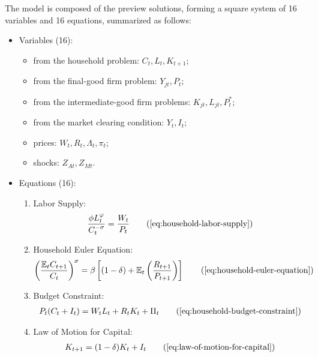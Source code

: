 \documentclass[
thesis.tex
]{subfiles}
\begin{document}
	The model is composed of the preview solutions, forming a square system of 16 variables and 16 equations, summarized as follows:
	
	{\singlespacing
		
		\begin{itemize}
			\item Variables (16):
			
			\begin{itemize}
				\item from the household problem: $C_t, L_t, K_{t+1}$;
				\item from the final-good firm problem: $Y_{jt}, P_t$;
				\item from the intermediate-good firm problems: $K_{jt}, L_{jt}, P_t^\ast$;
				\item from the market clearing condition: $Y_t, I_t$;
				\item prices: $W_t, R_t, \Lambda_t, \pi_t$;
				\item shocks: $Z_{At}, Z_{Mt}$.
			\end{itemize}
			\item Equations (16):
			
			\begin{enumerate}
				\item Labor Supply:
				\begin{align}
					\frac{\phi L_t^{\varphi}}{C_t^{-\sigma}} = \frac{W_t}{P_t}
					\tag{\ref{eq:household-labor-supply}}
				\end{align}
				
				\item Household Euler Equation:
				\begin{align}
					\left( \frac{\mathbb{E}_t C_{t+1}}{C_t} \right)^\sigma = \beta \left[ (1-\delta) + \mathbb{E}_t \left(\frac{R_{t+1}}{P_{t+1}}\right) \right]
					\tag{\ref{eq:household-euler-equation}}
				\end{align}
				
				\item Budget Constraint: 
				\begin{align}
					P_t (C_t + I_t) = W_t L_t + R_t K_t + \Pi_t
					\tag{\ref{eq:household-budget-constraint}}
				\end{align}
				
				\item Law of Motion for Capital:
				\begin{align}
					K_{t+1} = (1-\delta)K_t + I_t
					\tag{\ref{eq:law-of-motion-for-capital}}
				\end{align}
				

\end{enumerate}
\end{itemize}}
\end{document}
